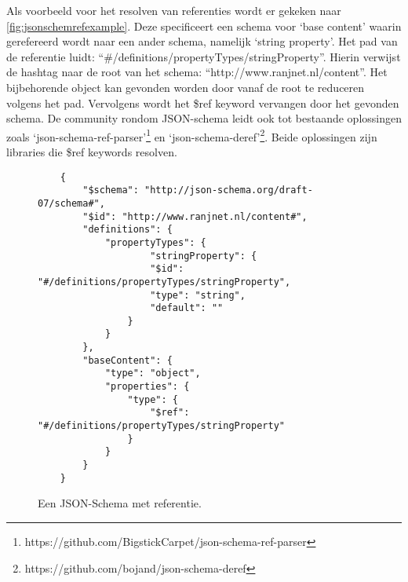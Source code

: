Als voorbeeld voor het resolven van referenties wordt er gekeken naar \autoref{fig:jsonschemrefexample}. Deze specificeert een schema voor ‘base content’ waarin gerefereerd wordt naar een ander schema, namelijk ‘string property’. Het pad van de referentie luidt: “\#/definitions/propertyTypes/stringProperty”. Hierin verwijst de hashtag naar de root van het schema: “http://www.ranjnet.nl/content”. Het bijbehorende object kan gevonden worden door vanaf de root te reduceren volgens het pad. Vervolgens wordt het \$ref keyword vervangen door het gevonden schema.
De community rondom JSON-schema leidt ook tot bestaande oplossingen zoals ‘json-schema-ref-parser’\footnote{https://github.com/BigstickCarpet/json-schema-ref-parser} en ‘json-schema-deref’\footnote{https://github.com/bojand/json-schema-deref }. Beide oplossingen zijn libraries die \$ref keywords resolven.


\begin{figure}[htb]
    \centering
    \lstset{language=JSON}
    \begin{lstlisting}
    {
        "$schema": "http://json-schema.org/draft-07/schema#",
        "$id": "http://www.ranjnet.nl/content#",
        "definitions": {
            "propertyTypes": {
                    "stringProperty": {
                    "$id": "#/definitions/propertyTypes/stringProperty",
                    "type": "string",
                    "default": ""
                }
            }
        },
        "baseContent": {
            "type": "object",
            "properties": {
                "type": {
                    "$ref": "#/definitions/propertyTypes/stringProperty"
                }
            }
        }
    }          
    \end{lstlisting}
    \caption{Een JSON-Schema met referentie.}
    \label{fig:jsonschemrefexample}
\end{figure}


